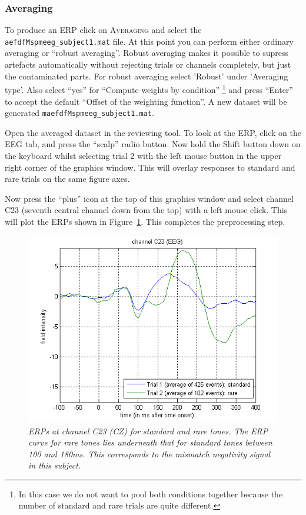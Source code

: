 \subsubsection{Averaging}
To produce an ERP click on \textsc{Averaging} and select the \texttt{aefdfMspmeeg\_subject1.mat} file. At this point you can perform either ordinary averaging or ``robust averaging''. Robust averaging makes it possible to supress artefacts automatically without rejecting trials or channels completely, but just the contaminated parts. For robust averaging select 'Robust' under 'Averaging type'.  Also select ``yes'' for ``Compute weights by condition'' \footnote{In this case we do not want to pool both conditions together because the number of standard and rare trials are quite different.} and press ``Enter'' to accept the default ``Offset of the weighting function''. A new dataset will be generated \texttt{maefdfMspmeeg\_subject1.mat}. 

Open the averaged dataset in the reviewing tool. To look at the ERP, click on the EEG tab, and press the ``scalp'' radio button. Now hold  the Shift button down on the keyboard whilst selecting trial 2 with the left mouse button in the upper right corner of the graphics window. This will overlay responses to standard and rare trials on the same figure axes.

Now press the ``plus'' icon at the top of this graphics window and select channel C23 (seventh central channel down from the top) with a left mouse click. This will plot the ERPs shown in Figure~\ref{c23}. This completes the preprocessing step.
\begin{figure}
\begin{center}
\includegraphics[width=120mm]{mmn/erp_c23}
\caption{\em ERPs at channel C23 (CZ) for standard and rare tones. The ERP curve for rare tones lies underneath that for standard tones between 100 and 180ms. This corresponds to the mismatch negativity signal in this subject. \label{c23}}
\end{center}
\end{figure}

